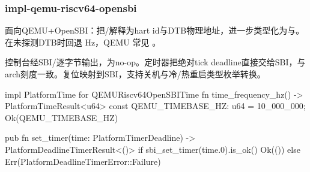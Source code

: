 
\subsubsection{impl-qemu-riscv64-opensbi}

面向QEMU+OpenSBI：把/解释为hart id与DTB物理地址，进一步类型化为与。在未探测DTB时回退 Hz，QEMU  常见 。

控制台经SBI/逐字节输出，为no-op。定时器把绝对tick deadline直接交给SBI，与arch刻度一致。复位映射到SBI，支持关机与冷/热重启类型枚举转换。

\begin{rustcode}
impl PlatformTime for QEMURiscv64OpenSBITime {
    fn time_frequency_hz() -> PlatformTimeResult<u64> {
        const QEMU_TIMEBASE_HZ: u64 = 10_000_000;
        Ok(QEMU_TIMEBASE_HZ)
    }
}

pub fn set_timer(time: PlatformTimerDeadline) -> PlatformDeadlineTimerResult<()> {
    if sbi_set_timer(time.0).is_ok() { Ok(()) }
    else { Err(PlatformDeadlineTimerError::Failure) }
}
\end{rustcode}
